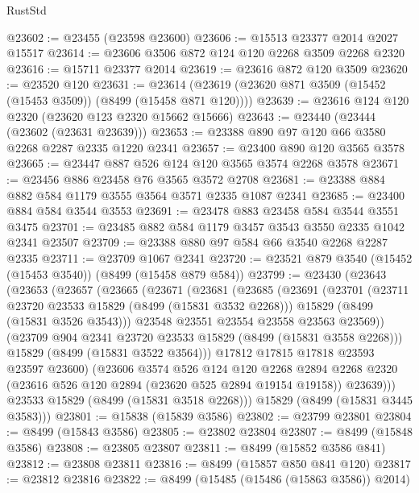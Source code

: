 \begin{lexlean}{RustStd}
\begin{coremodule}
@23602 := @23455 (@23598 @23600)
@23606 := @15513 @23377 @2014 @2027 @15517
@23614 := @23606 @3506 @872 @124 @120 @2268 @3509 @2268 @2320
@23616 := @15711 @23377 @2014
@23619 := @23616 @872 @120 @3509
@23620 := @23520 @120
@23631 := @23614 (@23619 (@23620 @871 @3509 (@15452 (@15453 @3509)) (@8499 (@15458 @871 @120))))
@23639 := @23616 @124 @120 @2320 (@23620 @123 @2320 @15662 @15666)
@23643 := @23440 (@23444 (@23602 (@23631 @23639)))
@23653 := @23388 @890 @97 @120 @66 @3580 @2268 @2287 @2335 @1220 @2341
@23657 := @23400 @890 @120 @3565 @3578
@23665 := @23447 @887 @526 @124 @120 @3565 @3574 @2268 @3578
@23671 := @23456 @886 @23458 @76 @3565 @3572 @2708
@23681 := @23388 @884 @882 @584 @1179 @3555 @3564 @3571 @2335 @1087 @2341
@23685 := @23400 @884 @584 @3544 @3553
@23691 := @23478 @883 @23458 @584 @3544 @3551 @3475
@23701 := @23485 @882 @584 @1179 @3457 @3543 @3550 @2335 @1042 @2341 @23507
@23709 := @23388 @880 @97 @584 @66 @3540 @2268 @2287 @2335
@23711 := @23709 @1067 @2341
@23720 := @23521 @879 @3540 (@15452 (@15453 @3540)) (@8499 (@15458 @879 @584))
@23799 := @23430
    (@23643
      (@23653
        (@23657
          (@23665
            (@23671
              (@23681
                (@23685
                  (@23691
                    (@23701
                      (@23711 @23720 @23533 @15829 (@8499 (@15831 @3532 @2268)))
                      @15829
                      (@8499 (@15831 @3526 @3543)))
                    @23548
                    @23551
                    @23554
                    @23558
                    @23563
                    @23569))
                (@23709 @904 @2341 @23720 @23533 @15829 (@8499 (@15831 @3558 @2268)))
                @15829
                (@8499 (@15831 @3522 @3564)))
              @17812
              @17815
              @17818
              @23593
              @23597
              @23600)
            (@23606
              @3574
              @526
              @124
              @120
              @2268
              @2894
              @2268
              @2320
              (@23616 @526 @120 @2894 (@23620 @525 @2894 @19154 @19158))
              @23639)))
        @23533
        @15829
        (@8499 (@15831 @3518 @2268)))
      @15829
      (@8499 (@15831 @3445 @3583)))
@23801 := @15838 (@15839 @3586)
@23802 := @23799 @23801
@23804 := @8499 (@15843 @3586)
@23805 := @23802 @23804
@23807 := @8499 (@15848 @3586)
@23808 := @23805 @23807
@23811 := @8499 (@15852 @3586 @841)
@23812 := @23808 @23811
@23816 := @8499 (@15857 @850 @841 @120)
@23817 := @23812 @23816
@23822 := @8499 (@15485 (@15486 (@15863 @3586)) @2014)

\end{coremodule}
\end{lexlean}
